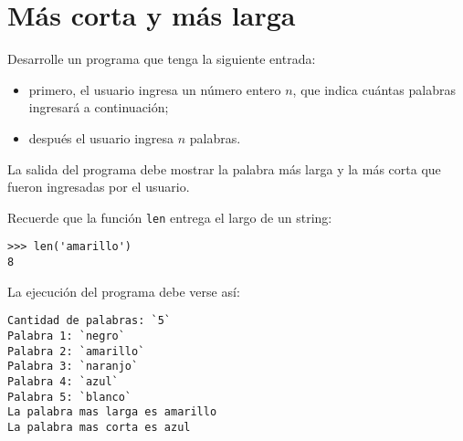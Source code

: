 \section{Más corta y más larga}

Desarrolle un programa que tenga la siguiente entrada:

\begin{itemize}
\item
  primero, el usuario ingresa un número entero \(n\), que indica
  cuántas palabras ingresará a continuación;
\item
  después el usuario ingresa \(n\) palabras.
\end{itemize}

La salida del programa debe mostrar la palabra más larga y la más corta
que fueron ingresadas por el usuario.

Recuerde que la función \lstinline!len! entrega el largo de un string:

\begin{lstlisting}
>>> len('amarillo')
8
\end{lstlisting}

La ejecución del programa debe verse así:
\begin{lstlisting}[language=testcase]
Cantidad de palabras: `5`
Palabra 1: `negro`
Palabra 2: `amarillo`
Palabra 3: `naranjo`
Palabra 4: `azul`
Palabra 5: `blanco`
La palabra mas larga es amarillo
La palabra mas corta es azul
\end{lstlisting}


